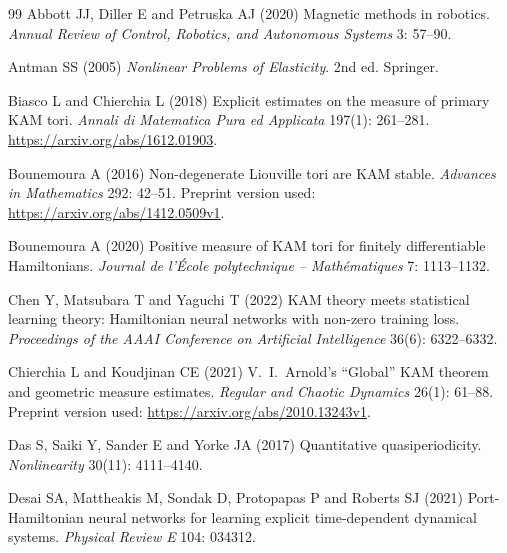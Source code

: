 \begin{thebibliography}{99}
Abbott JJ, Diller E and Petruska AJ (2020) Magnetic methods in robotics.
\textit{Annual Review of Control, Robotics, and Autonomous Systems} 3: 57--90.

Antman SS (2005) \textit{Nonlinear Problems of Elasticity}. 2nd ed. Springer.

Biasco L and Chierchia L (2018) Explicit estimates on the measure of primary KAM tori.
\textit{Annali di Matematica Pura ed Applicata} 197(1): 261--281.
\url{https://arxiv.org/abs/1612.01903}.

Bounemoura A (2016) Non-degenerate Liouville tori are KAM stable.
\textit{Advances in Mathematics} 292: 42--51.
Preprint version used: \url{https://arxiv.org/abs/1412.0509v1}.

Bounemoura A (2020) Positive measure of KAM tori for finitely differentiable Hamiltonians.
\textit{Journal de l'\'Ecole polytechnique -- Math\'ematiques} 7: 1113--1132.

Chen Y, Matsubara T and Yaguchi T (2022) KAM theory meets statistical learning theory:
Hamiltonian neural networks with non-zero training loss.
\textit{Proceedings of the AAAI Conference on Artificial Intelligence} 36(6): 6322--6332.

Chierchia L and Koudjinan CE (2021) V.~I.~Arnold's ``Global'' KAM theorem
and geometric measure estimates.
\textit{Regular and Chaotic Dynamics} 26(1): 61--88.
Preprint version used: \url{https://arxiv.org/abs/2010.13243v1}.

Das S, Saiki Y, Sander E and Yorke JA (2017) Quantitative quasiperiodicity.
\textit{Nonlinearity} 30(11): 4111--4140.

Desai SA, Mattheakis M, Sondak D, Protopapas P and Roberts SJ (2021)
Port-Hamiltonian neural networks for learning explicit time-dependent dynamical systems.
\textit{Physical Review E} 104: 034312. 


\end{thebibliography}
